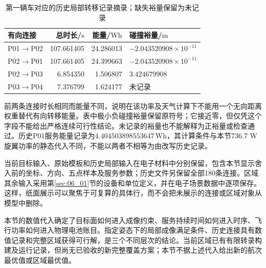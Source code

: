 \begin{table}[htbp]
\centering\small
\caption{第一辆车对应的历史局部转移记录摘录；缺失裕量保留为未记录}
\label{s0602:historical_leg_examples}
\begin{tabular}{@{}lrrl@{}}
\toprule
有向连接 & 总时长/$\mathrm s$ & 能量/$\mathrm{Wh}$ & 碰撞裕量/$\mathrm m$\\
\midrule
P01$\to$P02 & 107.661405 & 24.286013 & $-2.043520908\times10^{-11}$\\
P02$\to$P01 & 107.661405 & 24.399663 & $-2.043520908\times10^{-11}$\\
P02$\to$P03 & 6.854350 & 1.506807 & $3.424679908$\\
P03$\to$P04 & 7.376799 & 1.624177 & 未记录\\
\bottomrule
\end{tabular}
\end{table}

前两条连接时长相同而能量不同，说明在该功率及天气计算下不能用一个无向距离权重替代有向转移能量。表中极小负碰撞裕量保留原符号；它接近零，但仅凭这个字段不能给出严格连续可行性结论。未记录的裕量也不能解释为正裕量或检查通过。历史P01服务能量记录为$4.404503898553647\,\mathrm{Wh}$，其计算条件与本节736.7 W旋翼功率的静态代入不同，不能以两者不相等为由改写历史记录。

当前目标输入、原始模板和历史局部输入在电子材料中分别保留，包含本节显示舍入前的坐标、方向、五点样本及服务参数；历史文件另保留全部180条连接。区域其余输入采用第\ref{sec:06_01}节的设备和单位定义，并在电子场景数据中逐项保存。这样，纸面展示可以聚焦于可复算的具体行，而不会把未展示的连接或区域对象从模型中删除。

本节的数值代入确定了目标面如何进入成像约束、服务持续时间如何进入时序、飞行功率如何进入物理电池账目。指定姿态下的局部成像满足条件、历史连接具有数值记录和完整区域获得可行解，是三个不同层次的结论。当前区域已有有限转录构建及运行记录，但尚无已验收的新完整覆盖方案；本节不据上述代入给出新的航次最优值或区域最优值。
